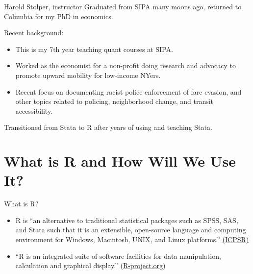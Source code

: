 \documentclass[
  8pt,
  ignorenonframetext,
  dvipsnames]{beamer}
\providecommand{\tightlist}{%
  \setlength{\itemsep}{0pt}\setlength{\parskip}{0pt}}
\let\olditem\item
\renewcommand{\item}{%
  \olditem\vspace{4pt}
}
\begin{document}
\begin{frame}{Harold Stolper, instructor}
\protect\hypertarget{harold-stolper-instructor}{}
Graduated from SIPA many moons ago, returned to Columbia for my PhD in
economics.

\medskip

Recent background:

\begin{itemize}
\tightlist
\item
  This is my 7th year teaching quant courses at SIPA.
\item
  Worked as the economist for a non-profit doing research and advocacy
  to promote upward mobility for low-income NYers.
\item
  Recent focus on documenting racist police enforcement of fare evasion,
  and other topics related to policing, neighborhood change, and transit
  accessibility.
\end{itemize}

\medskip

Transitioned from Stata to R after years of using and teaching Stata.
\end{frame}

\hypertarget{what-is-r-and-how-will-we-use-it}{%
\section{What is R and How Will We Use
It?}\label{what-is-r-and-how-will-we-use-it}}

\begin{frame}{What is R?}
\protect\hypertarget{what-is-r}{}
\begin{itemize}
\tightlist
\item
  R is ``an alternative to traditional statistical packages such as
  SPSS, SAS, and Stata such that it is an extensible, open-source
  language and computing environment for Windows, Macintosh, UNIX, and
  Linux platforms.''
  \href{https://www.icpsr.umich.edu/icpsrweb/content/shared/ICPSR/faqs/what-is-r.html}{(ICPSR)}
\end{itemize}

\medskip

\begin{itemize}
\tightlist
\item
  ``R is an integrated suite of software facilities for data
  manipulation, calculation and graphical display.''
  (\href{https://www.r-project.org/about.html}{R-project.org})
\end{itemize}
\end{frame}
\end{document}
